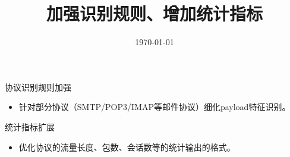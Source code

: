 \documentclass{article}
\title{加强识别规则、增加统计指标}
\author{}
\date{\today}
\begin{document}
\maketitle
协议识别规则加强
\begin{itemize}
    \item 针对部分协议（SMTP/POP3/IMAP等邮件协议）细化payload特征识别。
\end{itemize}

统计指标扩展
\begin{itemize}
    \item 优化协议的流量长度、包数、会话数等的统计输出的格式。
\end{itemize}
\end{document}
